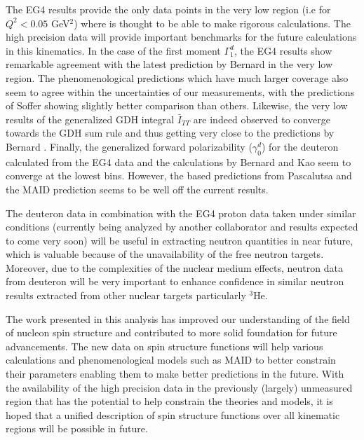 The EG4 results provide the only data points in the very low \qsqs region (i.e for $Q^2<0.05$ GeV$^2$) where \chipts is thought to be able to make rigorous calculations. The high precision data will provide important benchmarks for the future calculations in this kinematics. In the case of the first moment $\Gamma^d_1$, the EG4 results show remarkable agreement with the latest \chipts prediction by Bernard \etal \cite{BEKM13} in the very low \qsqs region. The phenomenological predictions which have much larger \qsqs coverage also seem to agree within the uncertainties of our measurements, with the predictions of Soffer \etal showing slightly better comparison than others. 
Likewise, the very low \qsqs results of the generalized GDH integral $\bar{I}_{TT}$ are indeed observed to converge towards the GDH sum rule and thus getting very close to the \chipts predictions by Bernard \etal \cite{BEKM13}. 
Finally, the generalized forward polarizability ($\gamma^d_0$) for the deuteron calculated from the EG4 data and the \chipts calculations by Bernard \etal and Kao \etal seem to converge at the lowest \qsqs bins.  However, the \chipts based predictions from Pascalutsa \etal and the MAID prediction seems to be well off the current results.


The deuteron data in combination with the EG4 proton data taken under similar conditions %
(currently being analyzed by another collaborator and results expected to come very soon) will be useful in extracting neutron quantities in near future, which is valuable because of the unavailability of the free neutron targets. Moreover, due to the complexities of the nuclear medium effects, neutron data from deuteron will be very important to enhance confidence in similar neutron results extracted from other nuclear targets particularly $^3$He. 

The work presented in this analysis has improved our understanding of the field of nucleon spin structure and contributed to more solid foundation for future advancements. 
The new data on spin structure functions will help various \chipts calculations and phenomenological models such as MAID to better constrain their parameters enabling them to make better predictions in the future.  %
With the availability of the high precision data in the previously (largely) unmeasured region that has the potential to help constrain the theories and models, it is hoped that a unified description of spin structure functions over all kinematic regions will be possible in future.

